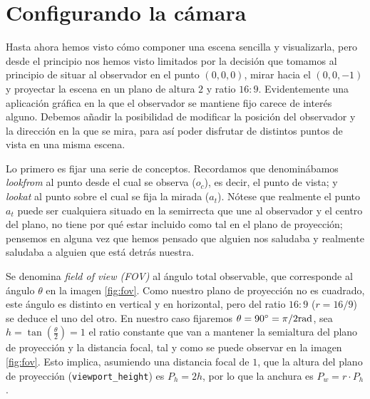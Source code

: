 \section{Configurando la cámara}
\label{section:camara}

Hasta ahora hemos visto cómo componer una escena sencilla y visualizarla, pero desde el principio nos hemos visto limitados por la decisión que tomamos al principio de situar al observador en el punto $(0,0,0)$, mirar hacia el $(0,0,-1)$ y proyectar la escena en un plano de altura $2$ y ratio $16:9$. Evidentemente una aplicación gráfica en la que el observador se mantiene fijo carece de interés alguno. Debemos añadir la posibilidad de modificar la posición del observador y la dirección en la que se mira, para así poder disfrutar de distintos puntos de vista en una misma escena.

Lo primero es fijar una serie de conceptos. Recordamos que denominábamos \textit{lookfrom} al punto desde el cual se observa ($o_c$), es decir, el punto de vista; y \textit{lookat} al punto sobre el cual se fija la mirada ($a_t$). Nótese que realmente el punto $a_t$ puede ser cualquiera situado en la semirrecta que une al observador y el centro del plano, no tiene por qué estar incluido como tal en el plano de proyección; pensemos en alguna vez que hemos pensado que alguien nos saludaba y realmente saludaba a alguien que está detrás nuestra.

Se denomina \textit{field of view (FOV)} al ángulo total observable, que corresponde al ángulo $\theta$ en la imagen \ref{fig:fov}. Como nuestro plano de proyección no es cuadrado, este ángulo es distinto en vertical y en horizontal, pero del ratio $16:9$ ($r=16/9$) se deduce el uno del otro. En nuestro caso fijaremos $\theta=90^\circ=\pi/2 \mathrm{rad}$, sea $h=\tan\left(\frac \theta 2\right)=1$ el ratio constante que van a mantener la semialtura del plano de proyección y la distancia focal, tal y como se puede observar en la imagen \ref{fig:fov}. Esto implica, asumiendo una distancia focal de $1$, que la altura del plano de proyección (\verb|viewport_height|) es $P_h=2h$, por lo que la anchura es $P_w=r\cdot P_h$. 

